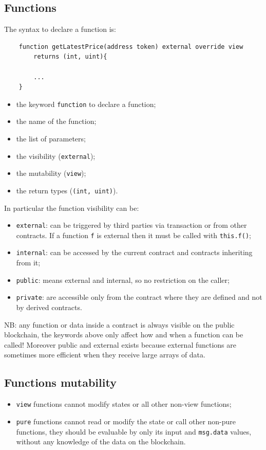 \subsection{Functions}
The syntax to declare a function is:
\begin{verbatim}
    function getLatestPrice(address token) external override view
        returns (int, uint){

        ...
    }
\end{verbatim}

\begin{itemize}
    \item the keyword \verb|function| to declare a function;
    \item the name of the function;
    \item the list of parameters;
    \item the visibility (\verb|external|);
    \item the mutability (\verb|view|);
    \item the return types (\verb|(int, uint)|).
\end{itemize}

In particular the function visibility can be:
\begin{itemize}
    \item \verb|external|: can be triggered by third parties via transaction or from other contracts.
    If a function \verb|f| is external then it must be called with \verb|this.f()|;

    \item \verb|internal|: can be accessed by the current contract and contracts inheriting from it;
    \item \verb|public|: means external and internal, so no restriction on the caller;

    \item \verb|private|: are accessible only from the contract where they are defined and not by derived contracts.
\end{itemize}

NB: any function or data inside a contract is always visible on the public blockchain, the keywords above only affect how and when a function can be called!
Moreover public and external exists because external functions are sometimes more efficient when they receive large arrays of data.

\subsection{Functions mutability}
\begin{itemize}
    \item \verb|view| functions cannot modify states or all other non-view functions;

    \item \verb|pure| functions cannot read or modify the state or call other non-pure functions, they should be evaluable by only its input and \verb|msg.data| values, without any knowledge of the data on the blockchain.
\end{itemize}

